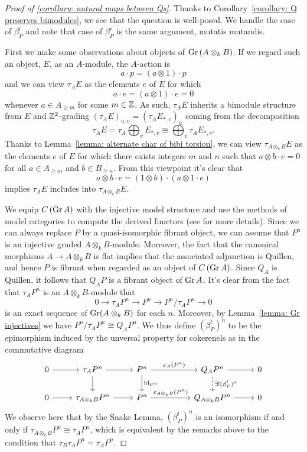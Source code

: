 \documentclass[dissertation.tex]{subfiles}
\begin{document}
\begin{proof}[Proof of {\ref{corollary: natural maps between Qs}}]
  Thanks to Corollary~\ref{corollary: Q preserves bimodules}, we see that the question is well-posed. We handle the case of \(\beta^l_P\) and note that case of \(\beta^r_P\) is the same argument, mutatis mutandis.

  First we make some observations about objects of \(\operatorname{Gr}\left(A \otimes_k B\right)\).
  If we regard such an object, \(E\), as an \(A\)-module, the \(A\)-action is
  \[a \cdot p = (a \otimes 1) \cdot p\]
  and we can view \(\tau_A E\) as the elements \(e\) of \(E\) for which
  \[a \cdot e = (a \otimes 1) \cdot e = 0\]
  whenever \(a \in A_{\geq m}\) for some \(m \in \mathbb{Z}\).
  As such, \(\tau_A E\) inherits a bimodule structure from \(E\) and \(\mathbb{Z}^2\)-grading \((\tau_A E)_{u,v} = (\tau_A E_{*,v})_u\) coming from the decomposition
  \[\tau_A E = \tau_A \bigoplus_v E_{\ast,v} \cong \bigoplus_v \tau_A E_{\ast,v}.\]
  Thanks to Lemma~\ref{lemma: alternate char of bibi torsion}, we can view \(\tau_{A \otimes_k B} E\) as the elements \(e\) of \(E\) for which there exists integers \(m\) and \(n\) such that \(a \otimes b \cdot e = 0\) for all \(a \in A_{\geq m}\) and \(b \in B_{\geq n}\).
  From this viewpoint it's clear that
  \[a \otimes b \cdot e = (1 \otimes b) \cdot (a \otimes 1 \cdot e)\]
  implies \(\tau_A E\) includes into \(\tau_{A \otimes_k B} E\).

  We equip \(C\left(\operatorname{Gr}A\right)\) with the injective model structure and use the methods of model categories to compute the derived functors (see \cite{Hov01} for more details).
  Since we can always replace \(P\) by a quasi-isomorphic fibrant object, we can assume that \(P^n\) is an injective graded \(A \otimes_k B\)-module.
  Moreover, the fact that the canonical morphisms \(A \to A \otimes_k B\) is flat implies that the associated adjunction is Quillen, and hence \(P\) is fibrant when regarded as an object of  \(C\left(\operatorname{Gr}A\right)\).
  Since \(Q_A\) is Quillen, it follows that \(Q_A P\) is a fibrant object of \(\operatorname{Gr}A\).
  It's clear from the fact that \(\tau_A P^n\) is an \(A \otimes_k B\)-module that   \[0 \to \tau_A P^n \to P^n \to P^n/\tau_A P^n \to 0\]
  is an exact sequence of \(\operatorname{Gr}(A \otimes_k B)\) for each \(n\).
  Moreover, by Lemma~\ref{lemma: Gr injectives} we have \(P^n/\tau_A P^n \cong Q_A P^n\).
  We thus define \((\beta^l_P)^n\) to be the epimorphism induced by the unversal property for cokerenels as in the commutative diagram
  \[\begin{tikzcd}
  0 \arrow{r} & \tau_{A} P^n \arrow{d}\arrow{r} & P^n \arrow{d}{\id_{P^n}}\arrow{rr}{\varepsilon_{A}(P^n)} && Q_{A} P^n \arrow{r}\arrow[dashed]{d}{\exists ! (\beta^l_P)^n} & 0\\
  0 \arrow{r} & \tau_{A \otimes_k B} P^n \arrow{r} & P^n\arrow{rr}{\varepsilon_{A \otimes_k B}(P^n)} && Q_{A \otimes_k B} P^n \arrow{r} & 0 
  \end{tikzcd}\]  We observe here that by the Snake Lemma, \((\beta^l_P)^n\) is an isomorphism if and only if \(\tau_{A \otimes_k B} P^n \cong \tau_A P^n\), which is equivalent by the remarks above to the condition that \(\tau_B \tau_A P^n = \tau_A P^n\).


\end{proof}
\end{document}
